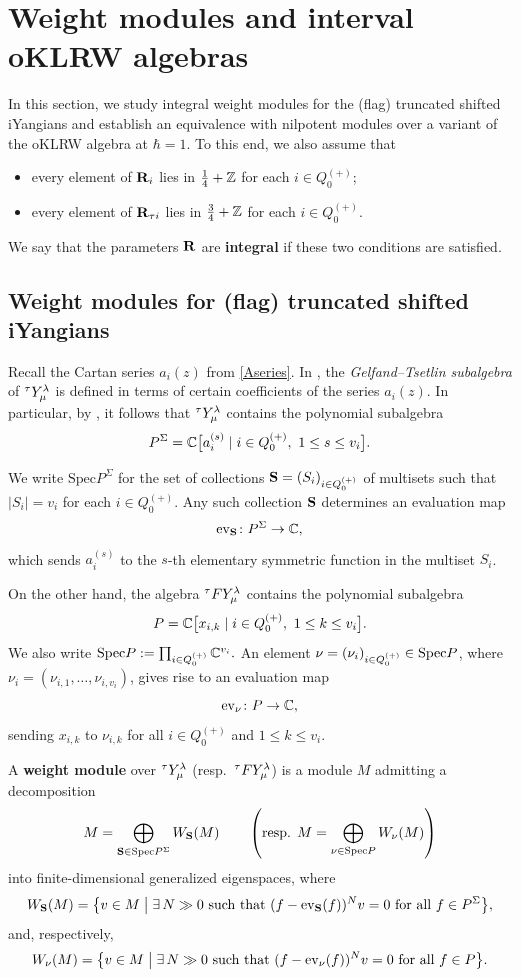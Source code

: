 
\section{Weight modules and interval oKLRW algebras}
In this section, we study integral weight modules for the (flag)
truncated shifted iYangians and establish an equivalence with
nilpotent modules over a variant of the oKLRW algebra at
\(\hbar=1\). 
To this end, we also assume that
\begin{itemize}
    \item every element of $\mathbf{R}_i$ lies in $\frac{1}{4}+\mathbb{Z}$ for each $i\in Q_0^{(+)}$;
    \item every element of $\mathbf{R}_{\tau i}$ lies in $\frac{3}{4}+\mathbb{Z}$ for each $i\in Q_0^{(+)}$.
\end{itemize}
We say that the parameters $\mathbf{R}$ are \textbf{integral} if these two conditions are satisfied.


\newcommand{\Spec}{\text{Spec}}

\subsection{Weight modules for (flag) truncated shifted iYangians}
Recall the Cartan series $a_i(z)$ from \cref{Aseries}.  
In \cite[(3.11)]{LWW2}, the \emph{Gelfand--Tsetlin subalgebra} of ${}^\tau Y_\mu^\lambda$ is defined in terms of certain coefficients of the series $a_i(z)$.  
In particular, by \cite[Proposition~3.12 and Remark~3.13]{LWW2}, it follows that ${}^\tau Y_\mu^\lambda$ contains the polynomial subalgebra
\[
P^\Sigma=\C\bigl[a_i^{(s)} \mid i\in Q_0^{(+)},\ 1\le s\le v_i\bigr].
\]

We write $\Spec P^\Sigma$ for the set of collections $\mathbf{S}=(S_i)_{i\in Q_0^{(+)}}$ of multisets such that $|S_i|=v_i$ for each $i\in Q_0^{(+)}$.  
Any such collection $\mathbf{S}$ determines an evaluation map
\[
\operatorname{ev}_{\mathbf{S}}\colon P^\Sigma \to \mathbb{C},
\]
which sends $a_i^{(s)}$ to the $s$-th elementary symmetric function in the multiset $S_i$.

On the other hand, the algebra ${}^\tau F Y_\mu^\lambda$ contains the polynomial subalgebra
\[
P=\mathbb{C}\bigl[x_{i,k}\mid i\in Q_0^{(+)},\ 1\le k\le v_i\bigr].
\]
We also write
\(
\Spec P := \prod_{i\in Q_0^{(+)}} \C^{v_i}.
\)
An element $\bnu=(\nu_i)_{i\in Q_0^{(+)}}\in \Spec P$, where $\nu_i=(\nu_{i,1},\dots,\nu_{i,v_i})$, gives rise to an evaluation map
\[
\operatorname{ev}_{\mathbf{\nu}}\colon P\to \mathbb{C},
\]
sending $x_{i,k}$ to $\nu_{i,k}$ for all $i\in Q_0^{(+)}$ and $1\le k\le v_i$.


\begin{definition}\label{def:wtmod}
A {\bf weight module} over ${}^\tau Y_\mu^\lambda$ (resp.\ ${}^\tau F Y_\mu^\lambda$) is a module $M$
admitting a decomposition
\[
M=\bigoplus_{\bS\in\Spec P^\Sigma}W_{\bS}(M)
\qquad
\left(
\text{resp. }
M=\bigoplus_{\bnu\in\Spec P}W_{\bnu}(M)
\right)
\]
into finite-dimensional generalized eigenspaces, where
\[
W_{\mathbf{S}}(M)
=
\bigl\{
v\in M
\;\big|\;
\exists\,N\gg 0\text{ such that }
(f-\operatorname{ev}_{\mathbf{S}}(f))^Nv=0
\text{ for all }f\in P^\Sigma
\bigr\},
\]
and, respectively,
\[
W_{\mathbf{\nu}}(M)
=
\bigl\{
v\in M
\;\big|\;
\exists\,N\gg 0\text{ such that }
(f-\operatorname{ev}_{\mathbf{\nu}}(f))^Nv=0
\text{ for all }f\in P
\bigr\}.
\]
\end{definition}

